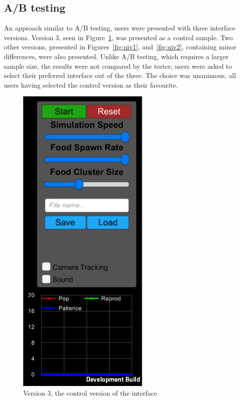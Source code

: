 \subsection{A/B testing}

An approach similar to A/B testing, users were presented with three interface versions. Version 3, seen in Figure~\ref{fig:uiv3}, was presented as a control sample. Two other versions, presented in Figures~\ref{fig:uiv1}, and~\ref{fig:uiv2}, containing minor differences, were also presented. Unlike A/B testing, which requires a larger sample size, the results were not compared by the tester; users were asked to select their preferred interface out of the three. The choice was unanimous, all users having selected the control version as their favourite.

\begin{figure}[!th]
	\centering
	\begin{minipage}[b]{0.32\textwidth}
		\centering
		\includegraphics[scale=0.65]{images/uiv3}
		\caption{\label{fig:uiv3}Version 3, the control version of the interface}
	\end{minipage}
	\hfill
	\begin{minipage}[b]{0.32\textwidth}

\end{minipage}
\end{figure}
